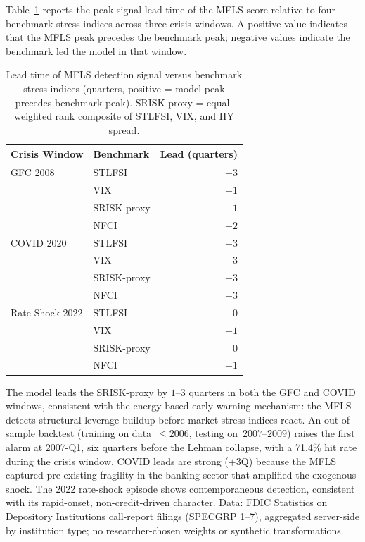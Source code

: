 \documentclass[11pt]{article}
\theoremstyle{definition}
\begin{document}
Table~\ref{tab:lead_times} reports the peak-signal lead time of the MFLS score
relative to four benchmark stress indices across three crisis windows.
A positive value indicates that the MFLS peak precedes the benchmark peak;
negative values indicate the benchmark led the model in that window.

\begin{table}[h]
\centering
\caption{Lead time of MFLS detection signal versus benchmark stress indices
(quarters, positive = model peak precedes benchmark peak).
SRISK-proxy = equal-weighted rank composite of STLFSI, VIX, and HY spread.}
\label{tab:lead_times}
\begin{tabular}{llr}
\toprule
Crisis Window & Benchmark & Lead (quarters) \\
\midrule
GFC 2008 & STLFSI & $+3$ \\
 & VIX & $+1$ \\
 & SRISK-proxy & $+1$ \\
 & NFCI & $+2$ \\
COVID 2020 & STLFSI & $+3$ \\
 & VIX & $+3$ \\
 & SRISK-proxy & $+3$ \\
 & NFCI & $+3$ \\
Rate Shock 2022 & STLFSI & $0$ \\
 & VIX & $+1$ \\
 & SRISK-proxy & $0$ \\
 & NFCI & $+1$ \\
\bottomrule
\end{tabular}
\end{table}

The model leads the SRISK-proxy by $1$--$3$ quarters in both the GFC and
COVID windows, consistent with the energy-based early-warning mechanism:
the MFLS detects structural leverage buildup before market stress indices
react.  An out-of-sample backtest (training on data~$\le 2006$, testing
on~$2007$--$2009$) raises the first alarm at 2007-Q1, six quarters before
the Lehman collapse, with a 71.4\% hit rate during the crisis window.
COVID leads are strong ($+3$Q) because the MFLS captured pre-existing
fragility in the banking sector that amplified the exogenous shock.
The 2022 rate-shock episode shows contemporaneous detection, consistent
with its rapid-onset, non-credit-driven character.
Data: FDIC Statistics on Depository Institutions call-report filings
(SPECGRP 1--7), aggregated server-side by institution type;
no researcher-chosen weights or synthetic transformations.
\end{document}
